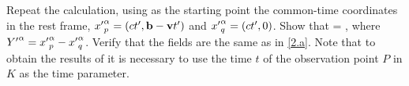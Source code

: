 \newcommand{\xpap}{{x'}^\alp_p}
\newcommand{\xpaq}{{x'}^\alp_q}
\newcommand{\Ya}{Y^\alp}
\newcommand{\Ysa}{Y_\alp}
\newcommand{\Yb}{Y^\bet}
\newcommand{\Ypa}{{Y'}^\alp}

\begin{problem}
	Repeat the calculation, using as the starting point the common-time coordinates in the rest frame, $\xpap = (ct', \vbb - \vv t')$ and $\xpaq = (ct', 0)$.  Show that
	\beqn \label{show2.b}
		\Fab =  \frac{\Ya \Ub - \Yb \Ua}{(- \Ysa \Ya)^{3/2}},
	\eeqn
	where $\Ypa = \xpap - \xpaq$.  Verify that the fields are the same as in \ref{2.a}.  Note that to obtain the results of  it is necessary to use the time $t$ of the observation point $P$ in $K$ as the time parameter.
\end{problem}

\newcommand{\Ypsa}{{Y'}_\alp}
\newcommand{\Ypb}{{Y'}^\bet}
\newcommand{\Upa}{{U'}^\alp}
\newcommand{\Upb}{{U'}^\bet}
\newcommand{\vo}{\mathbf{0}}
\newcommand{\tp}{{t'}}

